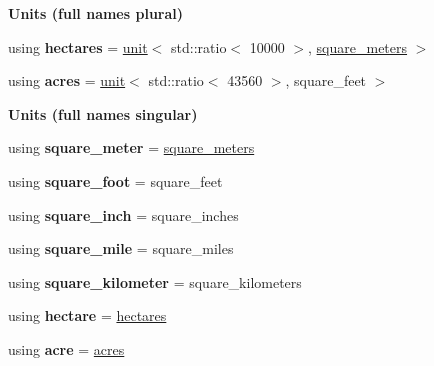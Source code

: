 \begin{Indent}{\bf Units (full names plural)}
\begin{DoxyCompactItemize}
\item 
\hypertarget{namespaceunits_1_1area_a83c77a9459392353ee619a59a7d3d901}{}using {\bfseries hectares} = \hyperlink{structunits_1_1unit}{unit}$<$ std\+::ratio$<$ 10000 $>$, \hyperlink{structunits_1_1unit}{square\+\_\+meters} $>$\label{namespaceunits_1_1area_a83c77a9459392353ee619a59a7d3d901}

\item 
\hypertarget{namespaceunits_1_1area_add133abc4e93746de8fb3e6aad8faf11}{}using {\bfseries acres} = \hyperlink{structunits_1_1unit}{unit}$<$ std\+::ratio$<$ 43560 $>$, square\+\_\+feet $>$\label{namespaceunits_1_1area_add133abc4e93746de8fb3e6aad8faf11}

\end{DoxyCompactItemize}
\end{Indent}
\begin{Indent}{\bf Units (full names singular)}\par
\begin{DoxyCompactItemize}
\item 
\hypertarget{namespaceunits_1_1area_a12c18127eb4c496f7fe7a501044fe1a7}{}using {\bfseries square\+\_\+meter} = \hyperlink{structunits_1_1unit}{square\+\_\+meters}\label{namespaceunits_1_1area_a12c18127eb4c496f7fe7a501044fe1a7}

\item 
\hypertarget{namespaceunits_1_1area_a1de84e9bd4b30e442b84569dba7d6fd3}{}using {\bfseries square\+\_\+foot} = square\+\_\+feet\label{namespaceunits_1_1area_a1de84e9bd4b30e442b84569dba7d6fd3}

\item 
\hypertarget{namespaceunits_1_1area_a93d6c6559410b1c7bdf45ddee2e3a5e6}{}using {\bfseries square\+\_\+inch} = square\+\_\+inches\label{namespaceunits_1_1area_a93d6c6559410b1c7bdf45ddee2e3a5e6}

\item 
\hypertarget{namespaceunits_1_1area_a92fd3e37624d9dab2935107ead2cbcc7}{}using {\bfseries square\+\_\+mile} = square\+\_\+miles\label{namespaceunits_1_1area_a92fd3e37624d9dab2935107ead2cbcc7}

\item 
\hypertarget{namespaceunits_1_1area_a1f6d57323a379042582944ebaf5f4a5d}{}using {\bfseries square\+\_\+kilometer} = square\+\_\+kilometers\label{namespaceunits_1_1area_a1f6d57323a379042582944ebaf5f4a5d}

\item 
\hypertarget{namespaceunits_1_1area_af748067d2c269bc083baf2dfa3cbf8ac}{}using {\bfseries hectare} = \hyperlink{structunits_1_1unit}{hectares}\label{namespaceunits_1_1area_af748067d2c269bc083baf2dfa3cbf8ac}

\item 
\hypertarget{namespaceunits_1_1area_abcc3df23cfc9c6c058250d87cd0a1c53}{}using {\bfseries acre} = \hyperlink{structunits_1_1unit}{acres}\label{namespaceunits_1_1area_abcc3df23cfc9c6c058250d87cd0a1c53}

\end{DoxyCompactItemize}
\end{Indent}
